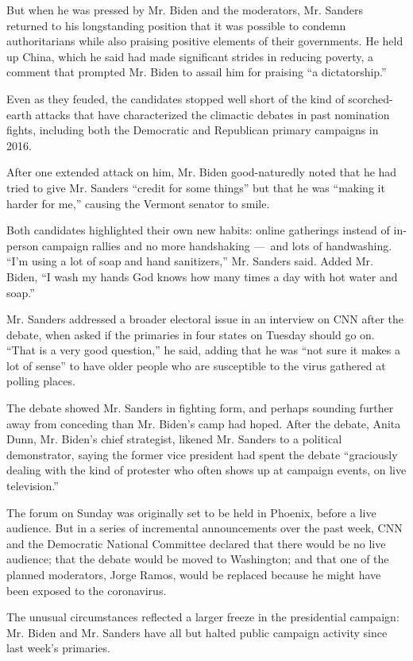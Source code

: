 But when he was pressed by Mr. Biden and the moderators, Mr. Sanders
returned to his longstanding position that it was possible to condemn
authoritarians while also praising positive elements of their
governments. He held up China, which he said had made significant
strides in reducing poverty, a comment that prompted Mr. Biden to assail
him for praising ``a dictatorship.''

Even as they feuded, the candidates stopped well short of the kind of
scorched-earth attacks that have characterized the climactic debates in
past nomination fights, including both the Democratic and Republican
primary campaigns in 2016.

After one extended attack on him, Mr. Biden good-naturedly noted that he
had tried to give Mr. Sanders ``credit for some things'' but that he was
``making it harder for me,'' causing the Vermont senator to smile.

Both candidates highlighted their own new habits: online gatherings
instead of in-person campaign rallies and no more handshaking ---~and
lots of handwashing. ``I'm using a lot of soap and hand sanitizers,''
Mr. Sanders said. Added Mr. Biden, ``I wash my hands God knows how many
times a day with hot water and soap.''

Mr. Sanders addressed a broader electoral issue in an interview on CNN
after the debate, when asked if the primaries in four states on Tuesday
should go on. ``That is a very good question,'' he said, adding that he
was ``not sure it makes a lot of sense'' to have older people who are
susceptible to the virus gathered at polling places.

The debate showed Mr. Sanders in fighting form, and perhaps sounding
further away from conceding than Mr. Biden's camp had hoped. After the
debate, Anita Dunn, Mr. Biden's chief strategist, likened Mr. Sanders to
a political demonstrator, saying the former vice president had spent the
debate ``graciously dealing with the kind of protester who often shows
up at campaign events, on live television.''

The forum on Sunday was originally set to be held in Phoenix, before a
live audience. But in a series of incremental announcements over the
past week, CNN and the Democratic National Committee declared that there
would be no live audience; that the debate would be moved to Washington;
and that one of the planned moderators, Jorge Ramos, would be replaced
because he might have been exposed to the coronavirus.

The unusual circumstances reflected a larger freeze in the presidential
campaign: Mr. Biden and Mr. Sanders have all but halted public campaign
activity since last week's primaries.

